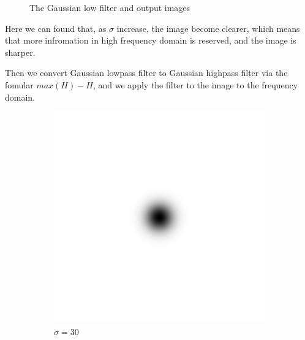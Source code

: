 \documentclass[
	12pt, %
]{style/fphw}
\begin{document}
\begin{figure}[H]
    \caption{The Gaussian low filter and output images}
    \label{Gaussian low filter}
\end{figure}

Here we can found that, as $\sigma$ increase, the image become clearer, which means that more infromation in high frequency domain is reserved, and the image is sharper.

Then we convert Gaussian lowpass filter to Gaussian highpass filter via the fomular $max(H)-H$, and we apply the filter to the image to the frequency domain.

\begin{figure}[H]
    \centering
     \begin{subfigure}[b]{.3\textwidth}
         \centering
         \includegraphics[width=\textwidth]{Q5_2_highpass_filter_30.png}
         \caption{$\sigma=30$}
         \label{Q5_2_highpass_filter_30}
     \end{subfigure}
     \hfill
     \begin{subfigure}[b]{.3\textwidth}
         \centering

\end{subfigure}
\end{figure}
\end{document}
